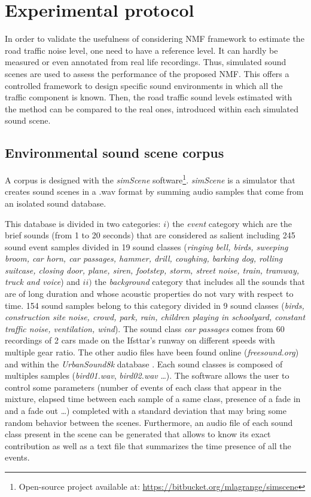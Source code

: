\documentclass[twocolumn,a4paper,10pt]{article}
\begin{document}
\section{Experimental protocol}\label{part:protocol}

In order to validate the usefulness of considering NMF framework to estimate the road traffic noise level, one need to have a reference level. It can hardly be measured or even annotated from real life recordings. Thus,  simulated sound scenes are used to assess the performance of the proposed NMF. This offers a controlled framework to design specific sound environments in which all the traffic component is known. Then, the road traffic sound levels estimated with the method can be compared to the real ones, introduced within each simulated sound scene.

\subsection{Environmental sound scene corpus}

A corpus is designed with the \textit{simScene} software\footnote{Open-source project available at: \url{https://bitbucket.org/mlagrange/simscene}}. \textit{simScene} \cite{rossignol_simscene:_2015} is a simulator that creates sound scenes in a .wav format by summing audio samples that come from an isolated sound database. 

This database is divided in two categories: $i)$ the \textit{event} category which are the brief sounds (from 1 to 20 seconds) that are considered as salient including 245 sound event samples divided in 19 sound classes (\textit{ringing bell, birds, sweeping broom, car horn, car passages, hammer, drill, coughing, barking dog, rolling suitcase, closing door, plane, siren, footstep, storm, street noise, train, tramway, truck and voice}) and $ii)$ the \textit{background} category that includes all the sounds that are of long duration and whose acoustic properties do not vary with respect to time. 154 sound samples belong to this category divided in 9 sound classes (\textit{birds, construction site noise, crowd, park, rain, children playing in schoolyard, constant traffic noise, ventilation, wind}). The sound class \textit{car passages} comes from 60 recordings of 2 cars made on the Ifsttar's runway on different speeds with multiple gear ratio. The other audio files have been found online (\textit{freesound.org}) and within the \textit{UrbanSound8k} database \cite{salamon_dataset_nodate}. Each sound classes is composed of multiples samples (\textit{bird01.wav}, \textit{bird02.wav} \dots). 
The software allows the user to control some parameters (number of events of each class that appear in the mixture, elapsed time between each sample of a same class, presence of a fade in and a fade out \dots) completed with a standard deviation that may bring some random behavior between the scenes. Furthermore, an audio file of each sound class present in the scene can be generated that allows to know its exact contribution as well as a text file that summarizes the time presence of all the events.\\
\end{document}
